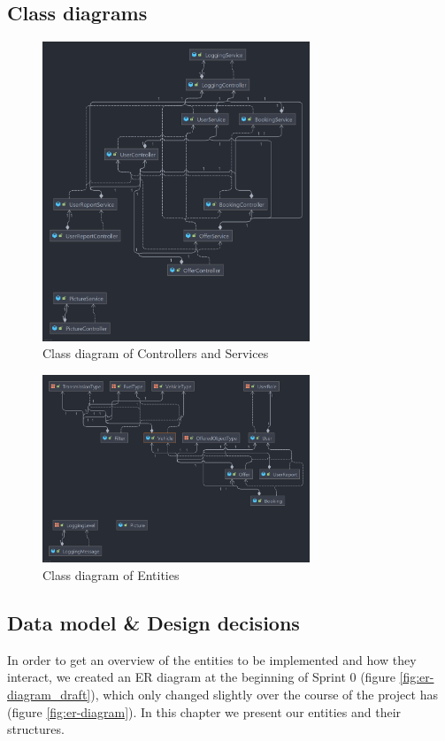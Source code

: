 \subsection{Class diagrams}
\begin{figure}[h]
	\centering
	\includegraphics[width=8cm]{resources/images/class diagrams/class-diagram_controller-services.png}
	\caption{Class diagram of Controllers and Services}
	\label{fig:cd:controller-services}
\end{figure}
\begin{figure}[h]
	\centering
	\includegraphics[width=8cm]{resources/images/class diagrams/class-diagram_entities.png}
	\caption{Class diagram of Entities}
	\label{fig:cd:entities}
\end{figure}

\subsection{Data model \& Design decisions}
In order to get an overview of the entities to be implemented and how they interact, we created an ER diagram at the beginning of Sprint 0 (figure \ref{fig:er-diagram_draft}), which only changed slightly over the course of the project has (figure \ref{fig:er-diagram}). In this chapter we present our entities and their structures.

